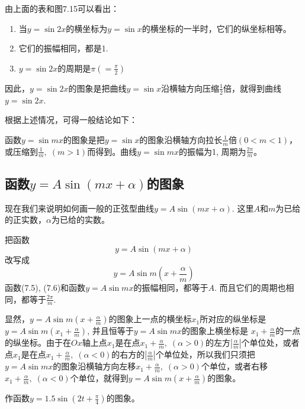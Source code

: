 由上面的表和图7.15可以看出：
\begin{enumerate}
    \item 当$y=\sin2x$的横坐标为$y=\sin x$的横坐标的一半时，它们的纵坐标相等。
    \item 它们的振幅相同，都是1.
    \item $y=\sin2x$的周期是$\pi\left(=\frac{\pi}{2}\right)$
\end{enumerate}

因此，$y=\sin2x$的图象是把曲线$y=\sin x$沿横轴方向压缩$\frac{1}{2}$倍，就得到曲线$y=\sin2x$.

根据上述情况，可得一般结论如下：

\begin{blk}{}
   函数$y=\sin mx$的图象是把$y=\sin x$的图象沿横轴方向拉长$\frac{1}{m}$倍$(0<m<1)$，或压缩到$\frac{1}{m},\; (m>1)$而得到。曲线$y=\sin mx$的振幅为1, 周期为$\frac{2\pi}{m}$。 
\end{blk}

\subsection{函数$y=A\sin(mx+\alpha)$的图象}

现在我们来说明如何画一般的正弦型曲线$y=A\sin(mx+\alpha)$. 这里$A$和$m$为已给的正实数，$\alpha$为已给的实数。

把函数
\begin{equation}
    y=A\sin(mx+\alpha)
\end{equation}
改写成
\begin{equation}
    y=A\sin m\left(x+\frac{\alpha}{m}\right)
\end{equation}
函数(7.5), (7.6)和函数$y=A\sin mx$的振幅相同，都等于$A$. 而且它们的周期也相同，都等于$\frac{2\pi}{m}$.

显然，$y=A\sin m\left(x+\frac{\alpha}{m}\right)$的图象上一点的横坐标$x_1$所对应的纵坐标是$y=A\sin m\left(x_1+\frac{\alpha}{m}\right)$, 并且恒等于$y=A\sin mx$的图象上横坐标是
$x_1+\frac{\alpha}{m}$的一点的纵坐标。由于在$Ox$轴上点$x_1$是在点$x_1+\frac{\alpha}{m},\;(\alpha>0)$的左方$\left|\frac{\alpha}{m}\right|$个单位处，或者点$x_1$是在点$x_1+\frac{\alpha}{m},\;(\alpha<0)$的右方的$\left|\frac{\alpha}{m}\right|$个单位处，所以我们只须把
$y=A\sin mx$的图象沿横轴方向左移$x_1+\frac{\alpha}{m},\;(\alpha>0)$个单位，或者右移$x_1+\frac{\alpha}{m},\;(\alpha<0)$个单位，就得到$y=A\sin m\left(x+\frac{\alpha}{m}\right)$的图象。

\begin{example}
作函数$y=1.5\sin \left(2t+\frac{\pi}{4}\right)$的图象。
\end{example}

